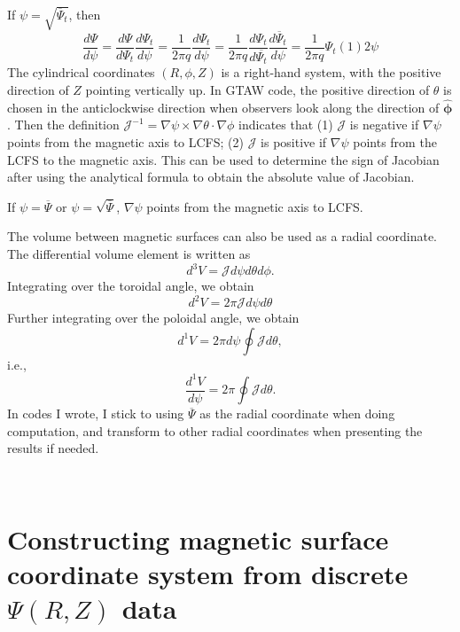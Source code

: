 \documentclass{llncs}
\newcommand{\tmmathbf}[1]{\ensuremath{\boldsymbol{#1}}}
\begin{document}
If $\psi = \sqrt{\overline{\Psi}_t}$, then
\begin{equation}
  \frac{d \Psi}{d \psi} = \frac{d \Psi}{d \Psi_t}  \frac{d \Psi_t}{d \psi} =
  \frac{1}{2 \pi q}  \frac{d \Psi_t}{d \psi} = \frac{1}{2 \pi q}  \frac{d
  \Psi_t}{d \overline{\Psi_t}}  \frac{d \overline{\Psi}_t}{d \psi} =
  \frac{1}{2 \pi q} \Psi_t (1) 2 \psi
\end{equation}
The cylindrical coordinates $(R, \phi, Z)$ is a right-hand system, with the
positive direction of $Z$ pointing vertically up. In GTAW code, the positive
direction of $\theta$ is chosen in the anticlockwise direction when observers
look along the direction of $\hat{\tmmathbf{\phi}}$. Then the definition
$\mathcal{J}^{- 1} = \nabla \psi \times \nabla \theta \cdot \nabla \phi$
indicates that (1) $\mathcal{J}$ is negative if $\nabla \psi$ points from the
magnetic axis to LCFS; (2) $\mathcal{J}$ is positive if $\nabla \psi$ points
from the LCFS to the magnetic axis. This can be used to determine the sign of
Jacobian after using the analytical formula to obtain the absolute value of
Jacobian.

If $\psi = \overline{\Psi}$ or $\psi = \sqrt{\overline{\Psi}}$, $\nabla \psi$
points from the magnetic axis to LCFS.

The volume between magnetic surfaces can also be used as a radial coordinate.
The differential volume element is written as
\begin{equation}
  d^3 V = \mathcal{J} d \psi d \theta d \phi .
\end{equation}
Integrating over the toroidal angle, we obtain
\begin{equation}
  d^2 V = 2 \pi \mathcal{J} d \psi d \theta
\end{equation}
Further integrating over the poloidal angle, we obtain
\begin{equation}
  d^1 V = 2 \pi d \psi \oint \mathcal{J} d \theta,
\end{equation}
i.e.,
\begin{equation}
  \frac{d^1 V}{d \psi} = 2 \pi \oint \mathcal{J} d \theta .
\end{equation}
In codes I wrote, I stick to using $\overline{\Psi}$ as the radial coordinate
when doing computation, and transform to other radial coordinates when
presenting the results if needed.

\

\section{Constructing magnetic surface coordinate system from discrete $\Psi
(R, Z)$ data}\label{6-25-1}
\end{document}
